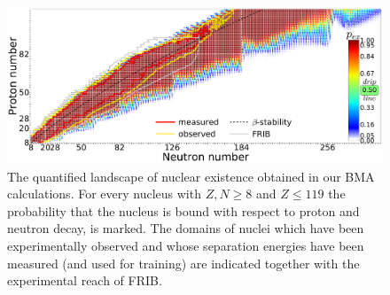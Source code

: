 \documentclass[%
10pt]{article}
\begin{document}
\begin{figure}[htb!]
\centering
\includegraphics[width=\linewidth]{figures/Landscape.pdf}
\caption{
The quantified  landscape of nuclear existence obtained in our BMA calculations. For every nucleus with $Z,N \ge 8$ and $Z\le 119$
the probability that  the nucleus is bound with respect to proton and neutron decay, is marked.
The domains of nuclei which have been experimentally observed and whose separation energies have been  measured (and  used for training) are indicated together with 
the experimental reach of  FRIB.
}
\end{figure}

\clearpage
\newpage
\end{document}
